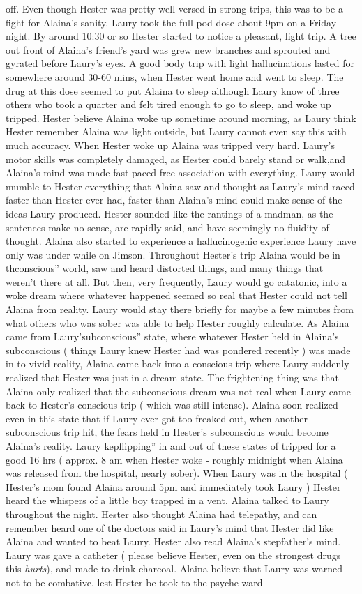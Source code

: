 \documentclass[12pt]{book}
\begin{document}
off. Even though Hester was pretty well versed in strong trips, this was to be a fight for Alaina's sanity. Laury took the full pod dose about 9pm on a Friday night. By around 10:30 or so Hester started to notice a pleasant, light trip. A tree out front of Alaina's friend's yard was grew new branches and sprouted and gyrated before Laury's eyes. A good body trip with light hallucinations lasted for somewhere around 30-60 mins, when Hester went home and went to sleep. The drug at this dose seemed to put Alaina to sleep although Laury know of three others who took a quarter and felt tired enough to go to sleep, and woke up tripped. Hester believe Alaina woke up sometime around morning, as Laury think Hester remember Alaina was light outside, but Laury cannot even say this with much accuracy. When Hester woke up Alaina was tripped very hard. Laury's motor skills was completely damaged, as Hester could barely stand or walk,and Alaina's mind was made fast-paced free association with everything. Laury would mumble to Hester everything that Alaina saw and thought as Laury's mind raced faster than Hester ever had, faster than Alaina's mind could make sense of the ideas Laury produced. Hester sounded like the rantings of a madman, as the sentences make no sense, are rapidly said, and have seemingly no fluidity of thought. Alaina also started to experience a hallucinogenic experience Laury have only was under while on Jimson. Throughout Hester's trip Alaina would be in thconscious'' world, saw and heard distorted things, and many things that weren't there at all. But then, very frequently, Laury would go catatonic, into a woke dream where whatever happened seemed so real that Hester could not tell Alaina from reality. Laury would stay there briefly for maybe a few minutes from what others who was sober was able to help Hester roughly calculate. As Alaina came from Laury'subconscious'' state, where whatever Hester held in Alaina's subconscious ( things Laury knew Hester had was pondered recently ) was made in to vivid reality, Alaina came back into a conscious trip where Laury suddenly realized that Hester was just in a dream state. The frightening thing was that Alaina only realized that the subconscious dream was not real when Laury came back to Hester's conscious trip ( which was still intense). Alaina soon realized even in this state that if Laury ever got too freaked out, when another subconscious trip hit, the fears held in Hester's subconscious would become Alaina's reality. Laury kepflipping'' in and out of these states of tripped for a good 16 hrs ( approx. 8 am when Hester woke - roughly midnight when Alaina was released from the hospital, nearly sober). When Laury was in the hospital ( Hester's mom found Alaina around 5pm and immediately took Laury ) Hester heard the whispers of a little boy trapped in a vent. Alaina talked to Laury throughout the night. Hester also thought Alaina had telepathy, and can remember heard one of the doctors said in Laury's mind that Hester did like Alaina and wanted to beat Laury. Hester also read Alaina's stepfather's mind. Laury was gave a catheter ( please believe Hester, even on the strongest drugs this \emph{hurts}), and made to drink charcoal. Alaina believe that Laury was warned not to be combative, lest Hester be took to the psyche ward 
\end{document}
